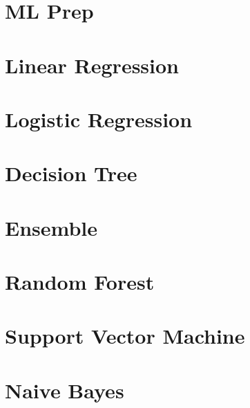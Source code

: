  \section[ML Prep]{ML Prep}




 \section[LinRegr]{Linear Regression}




 \section[LogiRegr]{Logistic Regression}





 \section[Tree]{Decision Tree}



 \section[Ensemble]{Ensemble}



 \section[RandomForest]{Random Forest}




 \section[SVM]{Support Vector Machine}



 \section[NB]{Naive Bayes}



